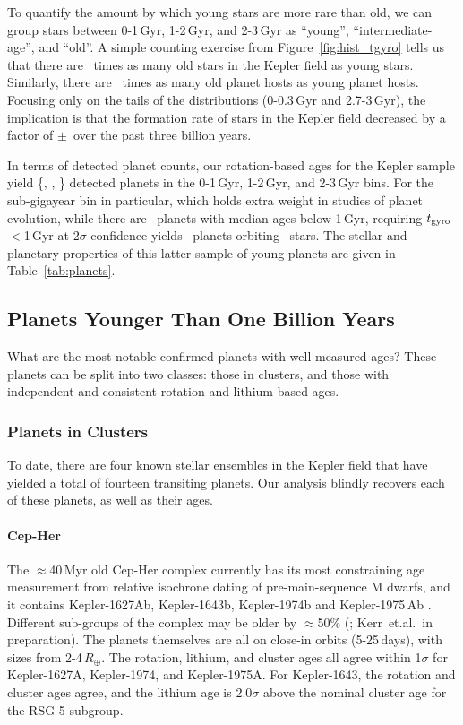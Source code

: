 \documentclass[11pt,twocolumn,tighten]{aastex63}
\begin{document}
To quantify the amount by which young stars are more rare than old, we
can group stars between 0-1\,Gyr, 1-2\,Gyr, and 2-3\,Gyr as ``young'',
``intermediate-age'', and ``old''.  A simple counting exercise from
Figure~\ref{fig:hist_tgyro} tells us that there are \ratioobtoybstars\
times as many old stars in the Kepler field as young stars.
Similarly, there are \ratioobtoybplanets\ times as many old planet
hosts as young planet hosts.  Focusing only on the tails of the
distributions (0-0.3\,Gyr and 2.7-3\,Gyr), the implication is that the
formation rate of stars in the Kepler field decreased by a factor of
\ratiosfr$\pm$\uncratiosfr\ over the past three billion years.

In terms of detected planet counts, our rotation-based ages for the
Kepler sample yield \{\nplyounggyro, \nplmidgyro, \nploldgyro\}
detected planets in the 0-1\,Gyr, 1-2\,Gyr, and 2-3\,Gyr bins.  For
the sub-gigayear bin in particular, which holds extra weight in
studies of planet evolution, while there are \nplyounggyro\ planets
with median ages below 1\,Gyr, requiring $t_{\rm gyro}$$<$1\,Gyr at
2$\sigma$ confidence yields \nplyounggyrotwosigma\ planets orbiting
\nplhostsyounggyrotwosigma\ stars.  The stellar and planetary
properties of this latter sample of young planets are given in
Table~\ref{tab:planets}.


\subsection{Planets Younger Than One Billion Years}

What are the most notable confirmed planets with well-measured ages?
These planets can be split into two classes:
those in clusters, and those with independent and consistent
rotation and lithium-based ages.

\subsubsection{Planets in Clusters}
\label{subsec:clusterplanets}

To date, there are four known stellar ensembles in the Kepler field that have
yielded a total of fourteen transiting planets.
Our analysis blindly recovers each of these planets, as well as their ages.

\paragraph{Cep-Her}
The $\approx$40\,Myr old Cep-Her complex currently has its most
constraining age measurement from relative isochrone dating of
pre-main-sequence M dwarfs, and it contains Kepler-1627Ab,
Kepler-1643b, Kepler-1974b and Kepler-1975\,Ab
\citep{Bouma_2022a,Bouma_2022b}.  Different sub-groups of the complex
may be older by $\approx$50\% (\citealt{Bouma_2022b};
Kerr~et.al.~in preparation).  The planets themselves are all on
close-in orbits (5-25\,days), with sizes from 2-4\,$R_\oplus$.  The
rotation, lithium, and cluster ages all agree within 1$\sigma$ for
Kepler-1627A, Kepler-1974, and Kepler-1975A.  For Kepler-1643, the
rotation and cluster ages agree, and the lithium age is 2.0$\sigma$
above the nominal cluster age for the RSG-5 subgroup.
\end{document}
